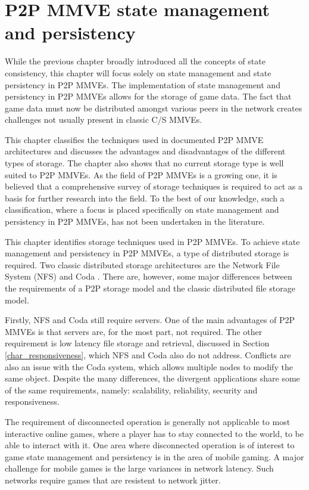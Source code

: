 \chapter{P2P MMVE state management and persistency}
\label{p2p_MMVE_state_persistency}

While the previous chapter broadly introduced all the concepts of state consistency, this chapter will focus solely on state management and state persistency in P2P MMVEs. The implementation of state management and persistency in P2P MMVEs allows for the storage of game data. The fact that game data must now be distributed amongst various peers in the network creates challenges not usually present in classic C/S MMVEs.

This chapter classifies the techniques used in documented P2P MMVE architectures and discusses the advantages and disadvantages of the different types of storage. The chapter also shows that no current storage type is well suited to P2P MMVEs. As the field of P2P MMVEs is a growing one, it is believed that a comprehensive survey of storage techniques is required to act as a basis for further research into the field. To the best of our knowledge, such a classification, where a focus is placed specifically on state management and persistency in P2P MMVEs, has not been undertaken in the literature.

This chapter identifies storage techniques used in P2P MMVEs. To achieve state management and persistency in P2P MMVEs, a type of distributed storage is required. Two classic distributed storage architectures are the Network File System (NFS) \cite{NFS4_protocol} and Coda  \cite{Kistler_Coda_disconnected}. There are, however, some major differences between the requirements of a P2P storage model and the classic distributed file storage model.

Firstly, NFS and Coda still require servers. One of the main advantages of P2P MMVEs is that servers are, for the most part, not required. The other requirement is low latency file storage and retrieval, discussed in Section \ref{char_responsiveness}, which NFS and Coda also do not address. Conflicts are also an issue with the Coda system, which allows multiple nodes to modify the same object. Despite the many differences, the divergent applications share some of the same requirements, namely: scalability, reliability, security and responsiveness.

The requirement of disconnected operation is generally not applicable to most interactive online games, where a player has to stay connected to the world, to be able to interact with it. One area where disconnected operation is of interest to game state management and persistency is in the area of mobile gaming. A major challenge for mobile games is the large variances in network latency. Such networks require games that are resistent to network jitter.

